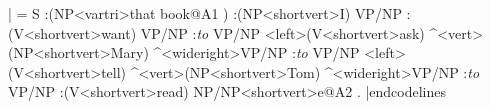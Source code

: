 \codelines
|\jtree[xunit=2.2em,yunit=1.5ex]
\def\\{<shortvert>}%
\! = {S}
   :({NP}<vartri>{that book}@A1 ) 
   :({NP}\\{I}) {VP/NP}
   :({V}\\{want}) {VP/NP}
   :{\it to} {VP/NP}
   <left>({V}\\{ask}) ^<vert>({NP}\\{Mary}) ^<wideright>{VP/NP}
   :{\it to} {VP/NP}
   <left>({V}\\{tell}) ^<vert>({NP}\\{Tom}) ^<wideright>{VP/NP}
   :{\it to} {VP/NP}
   :({V}\\{read}) {NP/NP}\\{e}@A2 .
\endjtree|endcodelines



